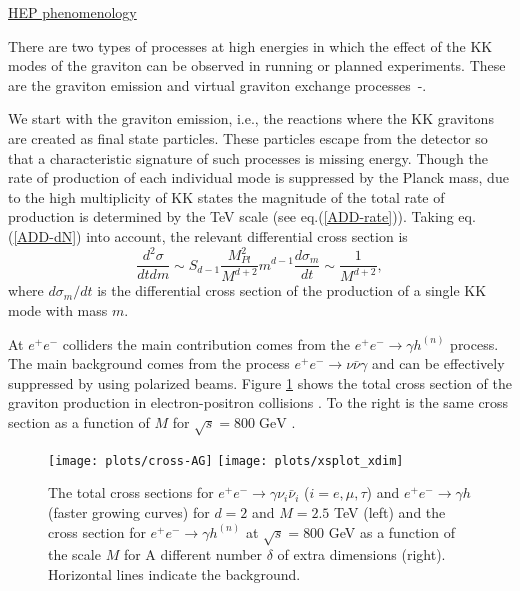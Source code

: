 \documentclass{cernyrep}
\begin{document}
\underline{HEP phenomenology}

There are two types of processes at high energies in which the
effect of the KK modes of the graviton can be observed in running
or planned experiments. These are the graviton emission and
virtual graviton exchange processes~\cite{GRW}-\cite{ChK}.

We start with the graviton emission, i.e., the reactions where the
KK gravitons are created as final state particles. These particles
escape from the detector so that a characteristic signature of
such processes is missing energy. Though the rate of production of
each individual mode is suppressed by the Planck mass, due to the
high multiplicity of KK states the magnitude of the total rate of
production is determined by the TeV scale (see
eq.(\ref{ADD-rate})). Taking eq.(\ref{ADD-dN}) into account, the
relevant differential cross section \cite{GRW} is
\begin{equation}\label{ADD-sigma}
  \frac{d^{2}\sigma}{dt dm} \sim  S_{d-1}
\frac{M^{2}_{Pl}}{M^{d+2}} m^{d-1} \frac{d \sigma_{m}}{dt} \sim
\frac{1}{M^{d+2}},
\end{equation}
 where $d \sigma_{m}/dt $ is the differential cross section of
the production of a single KK mode with mass $m$.

At $e^{+}e^{-}$ colliders the main contribution comes from the
$e^{+}e^{-} \rightarrow \gamma h^{(n)}$ process. The main
background comes from the process $e^{+}e^{-} \rightarrow \nu
\bar{\nu} \gamma$ and can be effectively suppressed by using
polarized beams. Figure \ref{fig:ADD-ee} shows the total cross
section of the graviton production in electron-positron collisions
\cite{ChK}. To the right is  the same cross section as a function
of $M$ for $\sqrt{s} = 800 \; \mbox{GeV}$ \cite{TDR-Wil}.
\begin{figure}[htb]
\begin{center}
\leavevmode
\texttt{[image: plots/cross-AG]}\hspace{1cm}
\texttt{[image: plots/xsplot\_xdim]}
\end{center}
\caption{The total cross sections for $e^{+}e^{-} \rightarrow
\gamma \nu_{i} \bar{\nu}_{i}$ ($i=e,\mu,\tau$)  and $e^{+}e^{-}
\rightarrow \gamma h$ (faster growing curves) for $d=2$ and $M =
2.5$ TeV \cite{ChK} (left) and the  cross section for $e^{+}e^{-}
\rightarrow \gamma h^{(n)}$ at $\sqrt{s}=800$ GeV as a function of
the scale $M$  for A different number  $\delta$ of extra
dimensions (right). Horizontal lines indicate the background.
\cite{TDR-Wil}} \label{fig:ADD-ee}
\end{figure}
\end{document}
